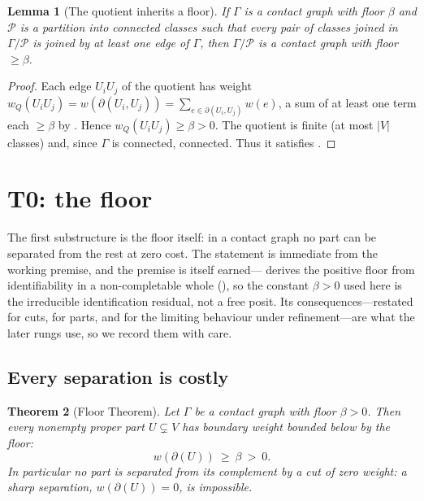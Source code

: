 \documentclass[11pt,a4paper]{article}
\theoremstyle{thmstyle}
\newtheorem{theorem}{Theorem}[section]
\newtheorem{lemma}[theorem]{Lemma}
\theoremstyle{definition}
\theoremstyle{remark}
\newcommand{\Gph}{\Gamma}                 %
\newcommand{\V}{V}                        %
\newcommand{\wt}{w}                       %
\newcommand{\floorc}{\beta}               %
\newcommand{\cut}{\partial}               %
\newcommand{\Quot}{Q}                     %
\newcommand{\abs}[1]{\lvert#1\rvert}
\begin{document}
\begin{lemma}[The quotient inherits a floor]
\label{lem:quotient-floor}
If $\Gph$ is a contact graph with floor $\floorc$ and $\mathcal{P}$ is a
partition into connected classes such that every pair of classes joined in
$\Gph/\mathcal{P}$ is joined by at least one edge of $\Gph$, then
$\Gph/\mathcal{P}$ is a contact graph with floor $\ge\floorc$.
\end{lemma}

\begin{proof}
Each edge $U_iU_j$ of the quotient has weight
$\wt_{\Quot}(U_iU_j)=\wt(\cut(U_i,U_j))=\sum_{e\in\cut(U_i,U_j)}\wt(e)$, a sum of
at least one term each $\ge\floorc$ by . Hence
$\wt_{\Quot}(U_iU_j)\ge\floorc>0$. The quotient is finite (at most $\abs{\V}$
classes) and, since $\Gph$ is connected, connected. Thus it satisfies
.
\end{proof}


\section{T0: the floor}
\label{sec:floor}

The first substructure is the floor itself: in a contact graph no part can be
separated from the rest at zero cost. The statement is immediate from the
working premise, and the premise is itself earned--- derives the
positive floor from identifiability in a non-completable whole
(), so the constant $\floorc>0$ used
here is the irreducible identification residual, not a free posit. Its
consequences---restated for cuts, for parts, and for the limiting behaviour under
refinement---are what the later rungs use, so we record them with care.

\subsection{Every separation is costly}

\begin{theorem}[Floor Theorem]
\label{thm:floor}
Let $\Gph$ be a contact graph with floor $\floorc>0$. Then every nonempty proper
part $U\subsetneq\V$ has boundary weight bounded below by the floor:
\[
\boxed{\ \wt(\cut(U))\ \ge\ \floorc\ >\ 0.\ }
\]
In particular no part is separated from its complement by a cut of zero
weight: a \emph{sharp} separation, $\wt(\cut(U))=0$, is impossible.
\end{theorem}
\end{document}
